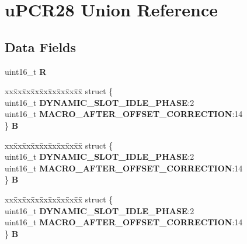 \hypertarget{unionuPCR28}{}\section{u\+P\+C\+R28 Union Reference}
\label{unionuPCR28}
\subsection*{Data Fields}
\begin{DoxyCompactItemize}
\item 
\mbox{\label{unionuPCR28_a073de271f90afca37dfe44c85f52646a}} 
uint16\+\_\+t {\bfseries R}
\item 
\mbox{\label{unionuPCR28_a0fe41e9935cedbfbec28967f8b3ff43d}} 
\begin{tabbing}
xx\=xx\=xx\=xx\=xx\=xx\=xx\=xx\=xx\=\kill
struct \{\\
\>uint16\_t {\bfseries DYNAMIC\_SLOT\_IDLE\_PHASE}:2\\
\>uint16\_t {\bfseries MACRO\_AFTER\_OFFSET\_CORRECTION}:14\\
\} {\bfseries B}\\

\end{tabbing}\item 
\mbox{\label{unionuPCR28_a711db6bbba659d140afb749591e1fae0}} 
\begin{tabbing}
xx\=xx\=xx\=xx\=xx\=xx\=xx\=xx\=xx\=\kill
struct \{\\
\>uint16\_t {\bfseries DYNAMIC\_SLOT\_IDLE\_PHASE}:2\\
\>uint16\_t {\bfseries MACRO\_AFTER\_OFFSET\_CORRECTION}:14\\
\} {\bfseries B}\\

\end{tabbing}\item 
\mbox{\label{unionuPCR28_ae9555e2fd12fc41553e6d8ff2b4a0089}} 
\begin{tabbing}
xx\=xx\=xx\=xx\=xx\=xx\=xx\=xx\=xx\=\kill
struct \{\\
\>uint16\_t {\bfseries DYNAMIC\_SLOT\_IDLE\_PHASE}:2\\
\>uint16\_t {\bfseries MACRO\_AFTER\_OFFSET\_CORRECTION}:14\\
\} {\bfseries B}\\


\end{tabbing}
\end{DoxyCompactItemize}
